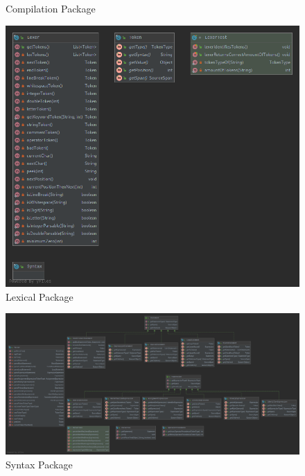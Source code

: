 \documentclass[
]{report}
\begin{document}
\begin{appendices}
\begin{figure}
		\caption{Compilation Package}
		\label{fig:compilation-package-diagram}
	\end{figure}
	\begin{figure}
		\centering
		\includegraphics[width=\textwidth]{lexical-package-diagram}
		\caption{Lexical Package}
		\label{fig:lexical-package-diagram}
	\end{figure}
	\begin{figure}
		\centering
		\includegraphics[width=\textwidth]{syntax-package-diagram}
		\caption{Syntax Package}
		\label{fig:syntax-package-diagram}
	\end{figure}
	\begin{figure}
		\centering

\end{figure}
\end{appendices}
\end{document}
